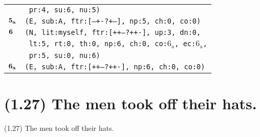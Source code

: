 \documentclass{article}
\begin{document}
\begin{minipage}{\textwidth}
{\begin{tabular}{|r|l|}
    & \texttt{\texttt{~pr:4,~su:6,~nu:5)}} \\
    ${\textbf{\textrm{5}}_{\textbf{\textrm{a}}}}$ & \texttt{\texttt{(E,~sub:A,~ftr:[---+-?+--],~np:5,~ch:0,~co:0)}} \\
    ${\textbf{\textrm{6}}_{\phantom{z}}}$ & \texttt{\texttt{(N,~lit:myself,~ftr:[++---?++-],~up:3,~dn:0,}} \\
    & \texttt{\texttt{~lt:5,~rt:0,~th:0,~np:6,~ch:0,~co:${\textrm{6}_{\textrm{a}}}$,~ec:${\textrm{6}_{\textrm{a}}}$,}} \\
    & \texttt{\texttt{~pr:5,~su:0,~nu:6)}} \\
    ${\textbf{\textrm{6}}_{\textbf{\textrm{a}}}}$ & \texttt{\texttt{(E,~sub:A,~ftr:[++---?++-],~np:6,~ch:0,~co:0)}} \\
    \hline
  \end{tabular}
  }
\end{minipage}
\bigbreak

\clearpage

%
%

\section*{(1.27) The men took off their hats.}

\bigbreak
\begin{enumerate*}
\item[(1.27)] The men took off their hats.
\end{enumerate*}
\bigbreak
\end{document}
